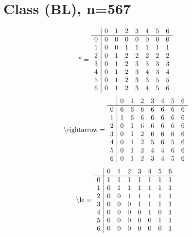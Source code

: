 \documentclass[11pt]{article}
\begin{document}
\section{Class (BL), n=567}
\[\text{*} = 
\begin{array}{r | r r r r r r r}
 & 0 & 1 & 2 & 3 & 4 & 5 & 6 \\ \hline
0 & 0 & 0 & 0 & 0 & 0 & 0 & 0 \\
1 & 0 & 0 & 1 & 1 & 1 & 1 & 1 \\
2 & 0 & 1 & 2 & 2 & 2 & 2 & 2 \\
3 & 0 & 1 & 2 & 3 & 3 & 3 & 3 \\
4 & 0 & 1 & 2 & 3 & 4 & 3 & 4 \\
5 & 0 & 1 & 2 & 3 & 3 & 5 & 5 \\
6 & 0 & 1 & 2 & 3 & 4 & 5 & 6 \\
\end{array}
\]
\[\text{\textbackslash rightarrow} = 
\begin{array}{r | r r r r r r r}
 & 0 & 1 & 2 & 3 & 4 & 5 & 6 \\ \hline
0 & 6 & 6 & 6 & 6 & 6 & 6 & 6 \\
1 & 1 & 6 & 6 & 6 & 6 & 6 & 6 \\
2 & 0 & 1 & 6 & 6 & 6 & 6 & 6 \\
3 & 0 & 1 & 2 & 6 & 6 & 6 & 6 \\
4 & 0 & 1 & 2 & 5 & 6 & 5 & 6 \\
5 & 0 & 1 & 2 & 4 & 4 & 6 & 6 \\
6 & 0 & 1 & 2 & 3 & 4 & 5 & 6 \\
\end{array}
\]
\[\text{\textbackslash le} = 
\begin{array}{r | r r r r r r r}
 & 0 & 1 & 2 & 3 & 4 & 5 & 6 \\ \hline
0 & 1 & 1 & 1 & 1 & 1 & 1 & 1 \\
1 & 0 & 1 & 1 & 1 & 1 & 1 & 1 \\
2 & 0 & 0 & 1 & 1 & 1 & 1 & 1 \\
3 & 0 & 0 & 0 & 1 & 1 & 1 & 1 \\
4 & 0 & 0 & 0 & 0 & 1 & 0 & 1 \\
5 & 0 & 0 & 0 & 0 & 0 & 1 & 1 \\
6 & 0 & 0 & 0 & 0 & 0 & 0 & 1 \\
\end{array}
\]
\end{document}
